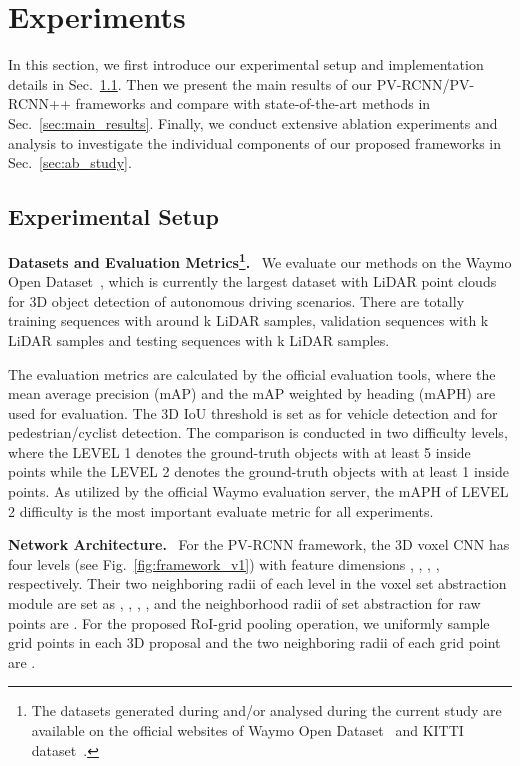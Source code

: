 \documentclass[natbib,twocolumn]{svjour3}          \smartqed  \usepackage{graphicx}
\begin{document}
\section{Experiments}
In this section, we first introduce our experimental setup and implementation details in Sec.~\ref{sec:exp_setup}. 
Then we present the main results of our PV-RCNN/PV-RCNN++ frameworks and compare with state-of-the-art methods in Sec.~\ref{sec:main_results}. 
Finally, we conduct extensive ablation experiments and analysis to investigate the individual components of our proposed frameworks in Sec.~\ref{sec:ab_study}.


\subsection{Experimental Setup}\label{sec:exp_setup}

\noindent
\textbf{Datasets and Evaluation Metrics\footnote{The datasets generated during and/or analysed during the current study are available on the official websites of Waymo Open Dataset~\citep{Sun_2020_CVPR} and KITTI dataset~\citep{Geiger2012CVPR}.}.}~
We evaluate our methods on the Waymo Open Dataset~\citep{Sun_2020_CVPR}, which is currently the largest dataset with LiDAR point clouds for 3D object detection of autonomous driving scenarios. There are totally  training sequences with around k LiDAR samples,  validation sequences with k LiDAR samples and  testing sequences with k LiDAR samples.  



The evaluation metrics are calculated by the official evaluation tools, where the mean average precision (mAP) and the mAP weighted by heading (mAPH) are used for evaluation. The 3D IoU threshold is set as  for vehicle detection and  for pedestrian/cyclist detection.
The comparison is conducted in two difficulty levels, where the LEVEL 1 denotes the ground-truth objects with at least 5 inside points while the LEVEL 2 denotes the ground-truth objects with at least 1 inside points. 
As utilized by the official Waymo evaluation server, the mAPH of LEVEL 2 difficulty is the most important evaluate metric for all experiments.

\noindent
\textbf{Network Architecture.}~
For the PV-RCNN framework, the 3D voxel CNN has four levels (see Fig.~\ref{fig:framework_v1}) with feature dimensions , , , , respectively. Their two neighboring radii  of each level in the voxel set abstraction module are set as , , , , and 
the neighborhood radii of set abstraction for raw points are . 
For the proposed RoI-grid pooling operation, we uniformly sample  grid points in each 3D proposal and the two neighboring radii  of each grid point are . 
\end{document}

